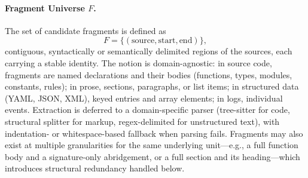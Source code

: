 \documentclass[11pt, a4paper]{article}
\begin{document}
\paragraph{Fragment Universe $F$.} The set of candidate fragments is defined as
\begin{equation}
F = \{(\mathrm{source}, \mathrm{start}, \mathrm{end})\},
\end{equation}
contiguous, syntactically or semantically delimited regions of the sources, each carrying a stable identity. The notion is domain-agnostic: in source code, fragments are named declarations and their bodies (functions, types, modules, constants, rules); in prose, sections, paragraphs, or list items; in structured data (YAML, JSON, XML), keyed entries and array elements; in logs, individual events. Extraction is deferred to a domain-specific parser (tree-sitter for code, structural splitter for markup, regex-delimited for unstructured text), with indentation- or whitespace-based fallback when parsing fails. Fragments may also exist at multiple granularities for the same underlying unit---e.g., a full function body and a signature-only abridgement, or a full section and its heading---which introduces structural redundancy handled below.
\end{document}
